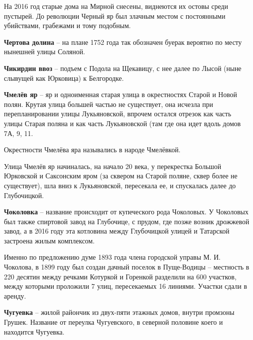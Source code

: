 На 2016 год старые дома на Мирной снесены, виднеются их остовы среди пустырей. До революции Черный яр был злачным местом с постоянными убийствами, грабежами и тому подобным.\\

\medskip

\textbf{Чертова долина} – на плане 1752 года так обозначен буерак вероятно по месту нынешней улицы Соляной.\\

\medskip

\textbf{Чикирдин ввоз} – подъем с Подола на Щекавицу, с нее далее по Лысой (ныне слывущей как Юрковица) к Белгородке.\\

\medskip



\textbf{Чмелёв яр} – яр и одноименная старая улица в окрестностях Старой и Новой полян. Крутая улица большей частью не существует, она исчезла при перепланировании улицы Лукьяновской, впрочем остался отрезок как часть улицы Старая поляна и как часть Лукьяновской (там где она идет вдоль домов 7А, 9, 11.

Окрестности Чмелёва яра назывались в народе Чмелёвкой.

Улица Чмелёв яр начиналась, на начало 20 века, у перекрестка Большой Юрковской и Саксонским яром (за сквером на Старой поляне, сквер более не существует), шла вниз к Лукьяновской, пересекала ее, и спускалась далее до Глубочицкой.\\


\newpage

\textbf{Чоколовка} – название происходит от купеческого рода Чоколовых. У Чоколовых был также спиртовой завод на Глубочице, с прудом, где позже возник дрожжевой завод, а в 2016 году эта котловина между Глубочицкой улицей и Татарской застроена жилым комплексом.

Именно по предложению думе 1893 года члена городской управы М. И. Чоколова, в 1899 году был создан дачный поселок в Пуще-Водицы – местность в 220 десятин между речками Котуркой и Горенкой разделили на 600 участков, между которыми проложили 7 улиц, пересекаемых 16 линиями. Участки сдали в аренду.\\

\medskip


\textbf{Чугуевка} – жилой райончик из двух-пяти этажных домов, внутри промзоны Грушек. Название от переулка Чугуевского, в северной половине коего и находится Чугуевка.